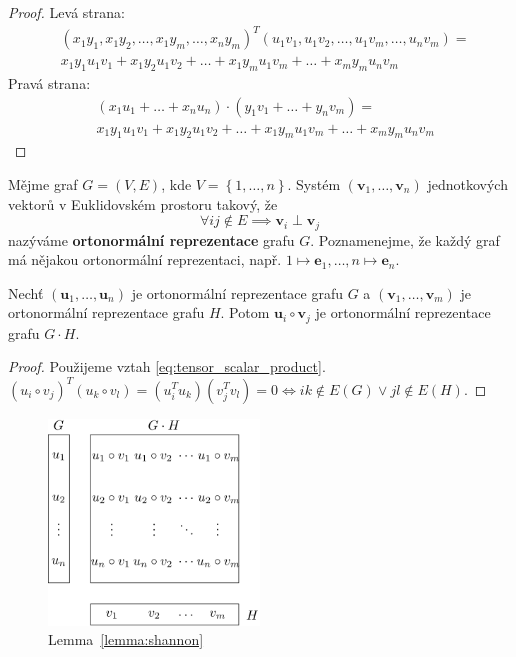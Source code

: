 \begin{proof}
    Levá strana:
    \begin{equation*}
        \begin{split}
        & \left(x_1 y_1, x_1 y_2, \dots, x_1 y_m, \dots, x_n y_m \right)^T \left( u_1 v_1, u_1 v_2, \dots, u_1 v_m, \dots, u_n v_m \right) = \\
        & x_1 y_1 u_1 v_1 + x_1 y_2 u_1 v_2 + \dots + x_1 y_m u_1 v_m + \dots + x_m y_m u_n v_m
        \end{split}
    \end{equation*}
    Pravá strana:
    \begin{equation*}
        \begin{split}
            & \left( x_1 u_1 + \dots + x_n u_n \right) \cdot \left( y_1 v_1 + \dots + y_n v_m \right) = \\
            & x_1 y_1 u_1 v_1 + x_1 y_2 u_1 v_2 + \dots + x_1 y_m u_1 v_m + \dots + x_m y_m u_n v_m
        \end{split}
    \end{equation*}
\end{proof}

Mějme graf $G = (V,E)$, kde $V = \left\{ 1, \dots, n \right\}$. Systém $\left( \textbf{v}_1, \dots, \textbf{v}_n \right)$ jednotkových vektorů v Euklidovském prostoru takový, že
$$
    \forall ij \notin E \implies \textbf{v}_i \perp \textbf{v}_j
$$
nazýváme \textbf{ortonormální reprezentace} grafu $G$. Poznamenejme, že každý graf má nějakou ortonormální reprezentaci, např. $1 \mapsto \mathbf{e}_1, \dots, n \mapsto \mathbf{e}_n$.

\begin{lm}
    Nechť $\left( \mathbf{u}_1, \dots, \mathbf{u}_n \right)$ je ortonormální reprezentace grafu $G$ a $\left( \mathbf{v}_1, \dots, \mathbf{v}_m \right)$ je ortonormální reprezentace grafu $H$. Potom $\mathbf{u}_i \circ \mathbf{v}_j$ je ortonormální reprezentace grafu $G \cdot H$.
    \label{lemma:shannon}
\end{lm}

\begin{proof}
    Použijeme vztah \ref{eq:tensor_scalar_product}. $\left( u_i \circ v_j \right)^T \left( u_k \circ v_l \right) = \left( u_i^T u_k \right) \left( v_j^T v_l \right) = 0 \iff ik \notin E(G) \vee jl \notin E(H)$.
\end{proof}

\begin{figure}[h!]
    \centering
    \includegraphics[width=0.5\textwidth]{img/shannon_lemma.png} 
    \caption{Lemma~\ref{lemma:shannon}}
\end{figure}

